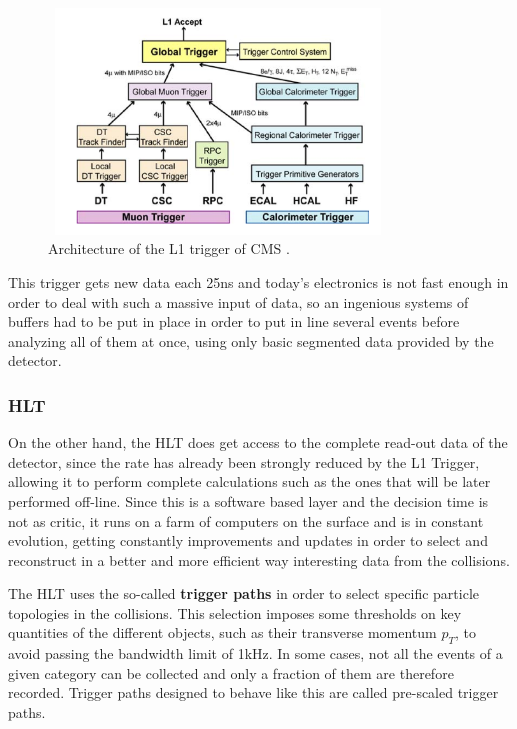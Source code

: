 \documentclass[a4paper, 10pt, openright]{report}
\begin{document}
\begin{figure}[htbp]
\begin{center}
\includegraphics[width=9cm, height=6cm]{figs/L1Trigg.png}
\caption{Architecture of the \ac{L1} trigger of \ac{CMS} \cite{CMSDescription}.}
\label{fig:L1Trigg}
\end{center}
\end{figure}

This trigger gets new data each 25ns and today's electronics is not fast enough in order to deal with such a massive input of data, so an ingenious systems of buffers had to be put in place in order to put in line several events before analyzing all of them at once, using only basic segmented data provided by the detector.

\subsubsection*{\acf{HLT}}

On the other hand, the \ac{HLT} \cite{HLT} does get access to the complete read-out data of the detector, since the rate has already been strongly reduced by the \ac{L1} Trigger, allowing it to perform complete calculations such as the ones that will be later performed off-line. Since this is a software based layer and the decision time is not as critic, it runs on a farm of computers on the surface and is in constant evolution, getting constantly improvements and updates in order to select and reconstruct in a better and more efficient way interesting data from the collisions.

The \ac{HLT} uses the so-called \textbf{trigger paths} in order to select specific particle topologies in the collisions. This selection imposes some thresholds on key quantities of the different objects, such as their transverse momentum $p_T$, to avoid passing the bandwidth limit of 1kHz. In some cases, not all the events of a given category can be collected and only a fraction of them are therefore recorded. Trigger paths designed to behave like this are called pre-scaled trigger paths.
\end{document}
